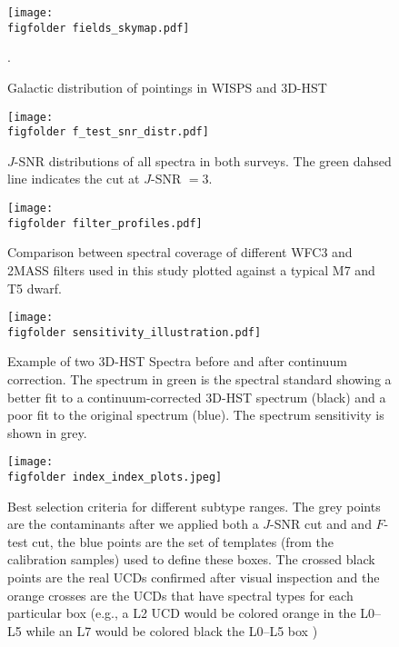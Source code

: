 \documentclass[manuscript]{aastex63}
\begin{document}
\begin{figure}
    \centering
    \texttt{[image: \\figfolder fields\_skymap.pdf]}
    \caption{Galactic distribution of pointings in WISPS and 3D-HST}.
    \label{fig:skymap}
\end{figure}

\begin{figure}
    \centering
    \texttt{[image: \\figfolder f\_test\_snr\_distr.pdf]}
    \caption{$J$-SNR distributions of all spectra in both surveys. The green dahsed line indicates the cut at $J$-SNR $=3$.}
    \label{fig:ftestdistr}
\end{figure}



\begin{figure}
    \centering
    \texttt{[image: \\figfolder filter\_profiles.pdf]}
    \caption{Comparison between spectral coverage of different WFC3 and 2MASS filters used in this study plotted against a typical M7 and T5 dwarf.}
    \label{fig:filterprofiles}
\end{figure}



\begin{figure}
\centering
\texttt{[image: \\figfolder sensitivity\_illustration.pdf]}
\caption{Example of two 3D-HST Spectra before and after continuum correction. The spectrum in green is the spectral standard showing a better fit to a continuum-corrected 3D-HST spectrum (black) and a poor fit to the original spectrum (blue). The spectrum sensitivity is shown in grey.}
\label{fig:sensitivity}
\end{figure}

\begin{sidewaysfigure}
    \centering
    \texttt{[image: \\figfolder index\_index\_plots.jpeg]}
    \caption{Best selection criteria for different subtype ranges. The grey points are the contaminants after we applied both a $J$-SNR cut and and $F$-test cut, the blue points are the set of templates (from the calibration samples) used to define these boxes. The crossed black points are the real UCDs confirmed after visual inspection and the orange crosses are the UCDs that have spectral types for each particular box (e.g., a L2 UCD would be colored orange in the L0--L5 while an L7 would be colored black the L0--L5 box )}
    \label{fig:indexplots}
\end{sidewaysfigure}
\end{document}
